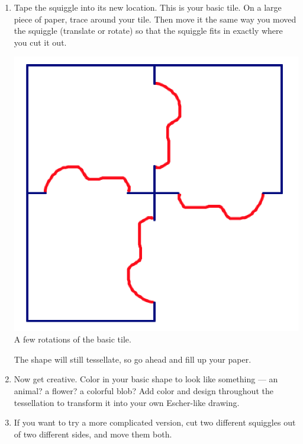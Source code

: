 \begin{enumerate}
\item
Tape the squiggle into its new location.  This is your basic tile.  On a large piece of paper, trace around your  tile.  Then move it the same way you moved the squiggle (translate or rotate) so that the squiggle fits in exactly where you cut it out.

\begin{center}
\includegraphics[scale=0.5]{eschdirect4}\\
A few rotations of the basic tile.

\end{center}
The shape will still tessellate, so go ahead and fill up your paper.\\


\item
Now get creative.  Color in your basic shape to look like something --- an animal?  a flower?  a colorful blob?  Add color and design throughout the tessellation to transform it into your own Escher-like drawing.\\

\item
If you want to try a more complicated version, cut two different squiggles out of two different sides, and move them both.  

\end{enumerate}





